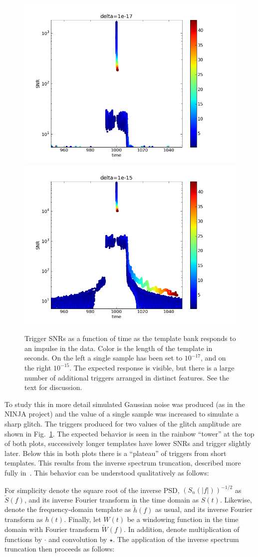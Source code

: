 \begin{figure}
  \includegraphics[width=0.5\linewidth]{figures/detchar/raw1_1e-17}
  \includegraphics[width=0.5\linewidth]{figures/detchar/raw1_1e-15}
  \caption[Response of the template bank to an impulse] {
  \label{f:impulses_original_no_chisq}
Trigger SNRs as a function of time as the template bank responds to an
impulse in the data.  Color is the length of the template in seconds.
On the left a single sample has been set to $10^{-17}$, and on the
right $10^{-15}$.  The expected response is visible, but there is a
large number of additional triggers arranged in distinct features.
See the text for discussion.
}
\end{figure}%

To study this in more detail simulated Gaussian noise was produced (as
in the NINJA project) and the value of a single sample was increased
to simulate a sharp glitch.  The triggers produced for two values of
the glitch amplitude are shown in
Fig.~\ref{f:impulses_original_no_chisq}.  The expected behavior is
seen in the rainbow ``tower'' at the top of both plots, successively
longer templates have lower SNRs and trigger slightly later.  Below
this in both plots there is a ``plateau'' of triggers from short
templates.  This results from the inverse spectrum truncation,
described more fully in~\cite{findchirp}.  This behavior can be
understood qualitatively as follows:

For simplicity denote the square root of the inverse PSD,
$(S_n(|f|))^{-1/2}$ as $\tilde{S}(f)$, and its inverse Fourier
transform in the time domain as $S(t)$.  Likewise, denote the
frequency-domain template as $\tilde{h}(f)$ as usual, and its inverse
Fourier transform as $h(t)$.  Finally, let $W(t)$ be a windowing
function in the time domain with Fourier transform $\tilde{W}(f)$.  In
addition, denote multiplication of functions by $\cdot$ and
convolution by $\star$.  The application of the inverse spectrum
truncation then proceeds as follows:

